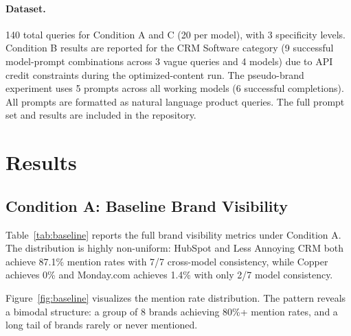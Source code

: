\documentclass{article}
\begin{document}
\paragraph{Dataset.}
140 total queries for Condition A and C (20 per model), with 3 specificity levels. Condition B results are reported for the CRM Software category (9 successful model-prompt combinations across 3 vague queries and 4 models) due to API credit constraints during the optimized-content run. The pseudo-brand experiment uses 5 prompts across all working models (6 successful completions). All prompts are formatted as natural language product queries. The full prompt set and results are included in the repository.

\section{Results}

\subsection{Condition A: Baseline Brand Visibility}

Table~\ref{tab:baseline} reports the full brand visibility metrics under Condition A. The distribution is highly non-uniform: HubSpot and Less Annoying CRM both achieve 87.1\% mention rates with 7/7 cross-model consistency, while Copper achieves 0\% and Monday.com achieves 1.4\% with only 2/7 model consistency.

Figure~\ref{fig:baseline} visualizes the mention rate distribution. The pattern reveals a bimodal structure: a group of 8 brands achieving 80\%+ mention rates, and a long tail of brands rarely or never mentioned.
\end{document}
